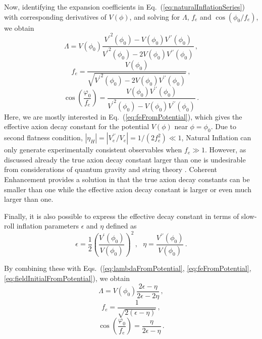 \documentclass[12pt]{article}
\begin{document}
Now, identifying the expansion coefficients in Eq.~(\ref{eq:naturalInflationSeries}) with corresponding derivatives of $V\left(\phi\right)$, and solving for $\Lambda$, $f_e$ and $\cos\left(\phi_0 / f_e\right)$, we obtain
\begin{equation} \label{eq:lambdaFromPotential}
  \Lambda = V\left(\phi_0\right) \frac
    {{V^\prime}^2\left(\phi_0\right) - V\left(\phi_0\right) V^{\prime\prime}\left(\phi_0\right)}
    {{V^\prime}^2\left(\phi_0\right) - 2 V\left(\phi_0\right) V^{\prime\prime}\left(\phi_0\right)}
  \,,
\end{equation}
\begin{equation} \label{eq:feFromPotential}
  f_e = \frac
    {V\left(\phi_0\right)}
    {\sqrt{{V^\prime}^2\left(\phi_0\right)
      - 2 V\left(\phi_0\right) V^{\prime\prime}\left(\phi_0\right)}}\,,
\end{equation}
\begin{equation} \label{eq:fieldInitialFromPotential}
  \cos\left(\frac{\varphi_0}{f_e}\right) = \frac
    {V\left(\phi_0\right) V^{\prime\prime}\left(\phi_0\right)}
    {{V^\prime}^2\left(\phi_0\right) - V\left(\phi_0\right) V^{\prime\prime}\left(\phi_0\right)}\,.
\end{equation}
Here, we are mostly interested in Eq.~(\ref{eq:feFromPotential}), which gives the effective axion decay constant for the potential $V\left(\phi\right)$ near $\phi = \phi_0$.
Due to second flatness condition, $\left|\eta_H\right| = \left|V_e^{\prime\prime} / V_e\right| = 1 / \left(2 f_e^2\right) \ll 1$, Natural Inflation can only generate experimentally consistent observables when $f_e \gg 1$.
However, as discussed already the true axion decay constant larger than one is undesirable from considerations of quantum gravity and string theory \cite{Kallosh:1995hi, Banks:2003sx}.
Coherent Enhancement provides a solution in that the true axion decay constants can be smaller than one while the effective axion decay constant is larger or even much larger than one.

Finally, it is also possible to express the effective decay constant in terms of slow-roll inflation parameters $\epsilon$ and $\eta$ defined as
\begin{equation} \label{eq:epsEtaFromPotential}
  \epsilon = \frac{1}{2} \left(\frac{V^\prime\left(\phi_0\right)}{V\left(\phi_0\right)}\right)^2\,,
  ~~~ \eta = \frac{V^{\prime\prime}\left(\phi_0\right)}{V\left(\phi_0\right)}\,.
\end{equation}

By combining these with Eqs.~(\ref{eq:lambdaFromPotential}, \ref{eq:feFromPotential}, \ref{eq:fieldInitialFromPotential}), we obtain
\begin{equation} \label{eq:lambdaSlowRoll}
  \Lambda = V\left(\phi_0\right) \frac{2 \epsilon - \eta}{2 \epsilon - 2 \eta}\,,
\end{equation}
\begin{equation} \label{eq:feSlowRoll}
  f_e = \frac{1}{\sqrt{2 \left(\epsilon - \eta\right)}}\,,
\end{equation}
\begin{equation} \label{eq:FieldInitialSlowRoll}
  \cos\left(\frac{\varphi_0}{f_e}\right) = \frac{\eta}{2 \epsilon - \eta}\,.
\end{equation}
\end{document}
